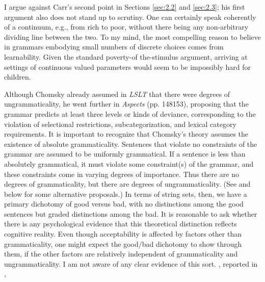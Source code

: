\indent
I argue against Carr's second point in Sections \ref{sec:2.2} and \ref{sec:2.3};
his first argument also does not stand up to scrutiny. One can certainly speak coherently of a continuum, e.g., from rich to poor, without there being any non-arbitrary dividing line between the two. To my mind, the most compelling reason to believe in grammars embodying small numbers of  discrete  choices  comes  from  learnability.  Given the standard poverty-of the-stimulus argument, arriving at settings of continuous valued parameters would seem to be impossibly hard for children.

Although Chomsky already assumed in \textit{LSLT} that there were degrees of ungrammaticality, he went further in \textit{Aspects} (pp. 148\textendash{}153), proposing that the grammar predicts at least three levels or kinds of deviance, corresponding to the violation of selectional restrictions, subcategorization, and lexical category requirements. It is important to recognize that Chomsky's theory assumes the existence of absolute grammaticality. Sentences that violate no constraints of the grammar are assumed to be uniformly grammatical. If a sentence is less than absolutely grammatical, it must violate some constraint(s)  of  the  grammar,  and these constraints come in varying degrees of importance. Thus there are no degrees of grammaticality, but there are degrees of ungrammaticality. (See \citet[vol. 3]{Levelt1974} and below for some alternative proposals.) In terms of string sets, then, we have a primary dichotomy of good versus bad, with no distinctions among the good sentences but graded distinctions among the bad. It is reasonable to ask whether there is any psychological evidence that this theoretical distinction reflects cognitive reality. Even though acceptability is affected by factors other than grammaticality, one might expect the good/bad dichotomy to show through
them, if the other factors are relatively independent of grammaticality and ungrammaticality. I am not aware of any clear evidence of this sort. \citet{Ross1979}, reported in , 
